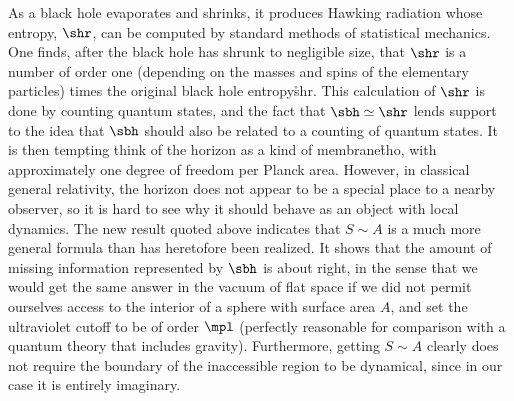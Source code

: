 As a black hole evaporates and shrinks, it produces Hawking radiation whose
entropy, $\shr$, can be computed by standard methods of statistical mechanics.
One finds, after the black hole has shrunk to negligible size, that $\shr$ is
a number of order one (depending on the masses and spins of the elementary
particles) times the original black hole entropy\r{shr}.
This calculation of $\shr$ is done by counting quantum states,
and the fact that $\sbh\simeq\shr$ lends support to the idea that $\sbh$
should also be related to a counting of quantum states.  It is then
tempting think of the horizon as a kind of membrane\r{tho}, with
approximately one degree of freedom per Planck area.  However, in
classical general relativity, the horizon does not appear to be
a special place to a nearby observer, so it is hard to see why it should
behave as an object with local dynamics.  The new result quoted above
indicates that $S\sim A$ is a much more general formula than has
heretofore been realized.  It shows that the amount of missing information
represented by $\sbh$ is about right, in the sense that we would get
the same answer in the vacuum of flat space if we did not permit ourselves
access to the interior of a sphere with surface area $A$, and set the
ultraviolet cutoff to be of order $\mpl$ (perfectly reasonable for comparison
with a quantum theory that includes gravity).  Furthermore, getting
$S\sim A$ clearly does not require the boundary of the inaccessible
region to be dynamical, since in our case it is entirely imaginary.


